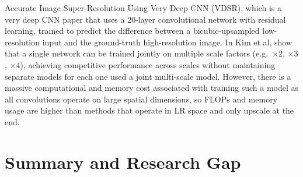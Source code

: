 Accurate Image Super-Resolution Using Very Deep CNN (VDSR), which is a very deep CNN paper that uses a 20-layer convolutional network with residual learning, trained to predict the difference between a bicubic-upsampled low-resolution input and the ground-truth high-resolution image. In \cite{kim2016vdsr} Kim et al, show that a single network can be trained jointly on multiple scale factors (e.g.\ $\times 2$, $\times 3$, $\times 4$), achieving competitive performance across scales without maintaining separate models for each one used a joint multi-scale model. However, there is a massive computational and memory cost associated with training such a model as all convolutions operate on large spatial dimensions, so FLOPs and memory usage are higher than methods that operate in LR space and only upscale at the end.





\section{Summary and Research Gap}
\label{sec:rw-summary-gap}

